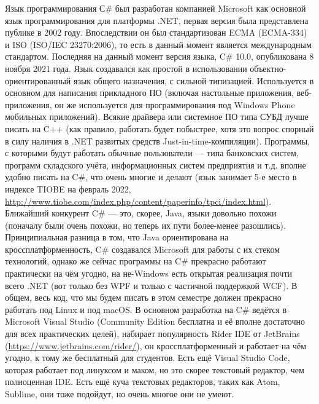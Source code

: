 \documentclass[a5paper]{article}
\begin{document}
Язык программирования С\# был разработан компанией Microsoft как основной язык программирования для платформы .NET, первая версия была представлена публике в 2002 году. Впоследствии он был стандартизован ECMA (ECMA-334) и ISO (ISO/IEC 23270:2006), то есть в данный момент является международным стандартом. Последняя на данный момент версия языка, C\# 10.0, опубликована 8 ноября 2021 года. Язык создавался как простой в использовании объектно-ориентированный язык общего назначения, с сильной типизацией. Используется в основном для написания прикладного ПО (включая настольные приложения, веб-приложения, он же используется для программирования под Windows Phone мобильных приложений). Всякие драйвера или системное ПО типа СУБД лучше писать на C++ (как правило, работать будет побыстрее, хотя это вопрос спорный в силу наличия в .NET развитых средств Just-in-time-компиляции). Программы, с которыми будут работать обычные пользователи --- типа банковских систем, программ складского учёта, информационных систем предприятия и т.д. вполне удобно писать на C\#, что очень многие и делают (язык занимает 5-е место в индексе TIOBE на февраль 2022, \url{http://www.tiobe.com/index.php/content/paperinfo/tpci/index.html}). Ближайший конкурент C\# --- это, скорее, Java, языки довольно похожи (поначалу были очень похожи, но теперь их пути более-менее разошлись). Принципиальная разница в том, что Java ориентирована на кроссплатформенность, C\# создавался Microsoft для работы с их стеком технологий, однако же сейчас программы на C\# прекрасно работают практически на чём угодно, на не-Windows есть открытая реализация почти всего .NET (вот только без WPF и только с частичной поддержкой WCF). В общем, весь код, что мы будем писать в этом семестре должен прекрасно работать под Linux и под macOS. В основном разработка на C\# ведётся в Microsoft Visual Studio (Community Edition бесплатна и её вполне достаточно для всех практических целей), набирает популярность Rider IDE от JetBrains (\url{https://www.jetbrains.com/rider/}), он кроссплатформенный и работает на чём угодно, к тому же бесплатный для студентов. Есть ещё Visual Studio Code, которая работает под линуксом и маком, но это скорее текстовый редактор, чем полноценная IDE. Есть ещё куча текстовых редакторов, таких как Atom, Sublime, они тоже подойдут, но очень многое они не умеют.
\end{document}
